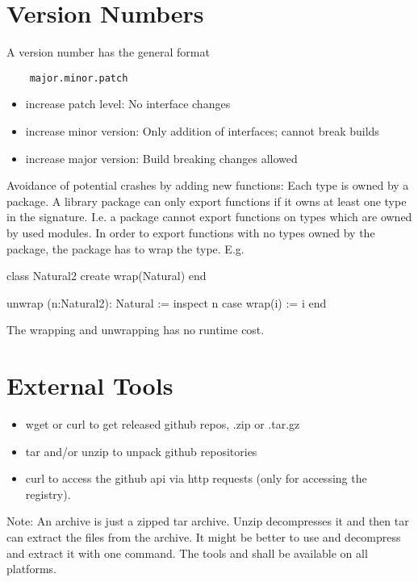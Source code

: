 \section{Version Numbers}

A version number has the general format

\begin{verbatim}
    major.minor.patch
\end{verbatim}

\begin{itemize}
\item increase patch level: No interface changes
\item increase minor version: Only addition of interfaces; cannot break builds
\item increase major version: Build breaking changes allowed
\end{itemize}

Avoidance of potential crashes by adding new functions: Each type is owned by
a package. A library package can only export functions if it owns at least one
type in the signature. I.e. a package cannot export functions on types which
are owned by used modules. In order to export functions with no types owned by
the package, the package has to wrap the type. E.g.

\begin{alba}
class Natural2 create
    wrap(Natural)
end

unwrap (n:Natural2): Natural :=
    inspect n case
        wrap(i) := i
    end
\end{alba}
%
The wrapping and unwrapping has no runtime cost.


\section{External Tools}

\begin{itemize}
\item wget or curl to get released github repos, .zip or .tar.gz
\item tar and/or unzip to unpack github repositories
\item curl to access the github api via http requests (only for accessing the
  registry).
\end{itemize}

Note: An archive  is just a zipped tar archive. Unzip
decompresses it and then tar can extract the files from the archive. It might
be better to use  and decompress and extract it with one
command. The tools  and  shall be available on all
platforms.



